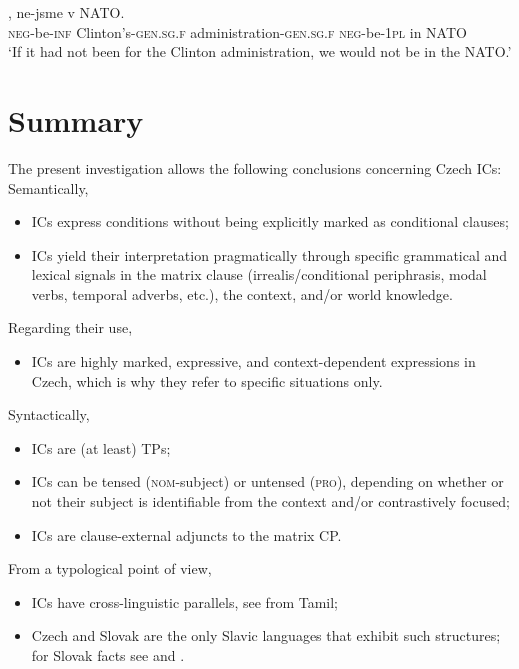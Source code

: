 \documentclass[output=paper,colorlinks,citecolor=brown,
modfonts,newtxmath
]{langscibook}
\begin{document}
\ea\label{ex:weltwissen}
, ne-jsme v NATO. \\
	{} \textsc{neg}-be-\textsc{inf} Clinton's-\textsc{gen.sg.f} administration-\textsc{gen.sg.f} \textsc{neg}-be-\textsc{1pl} in NATO \\
\glt `If it had not been for the Clinton administration, we would not be in the NATO.' \hfill \citep[Czech;][5]{Milotova2012}
\z


\section{Summary}\label{sec:summary}

The present investigation allows the following conclusions concerning Czech ICs:\\

Semantically,
\begin{itemize}
	\item ICs express conditions without being explicitly marked as conditional clauses;
	\item ICs yield their interpretation pragmatically through specific grammatical and lexical signals in the matrix clause (irrealis/conditional periphrasis, modal verbs, temporal adverbs, etc.), the context, and/or world knowledge.
\end{itemize}

Regarding their use,	
\begin{itemize}
	\item ICs are highly marked, expressive, and context-dependent expressions in Czech, which is why they refer to specific situations only.
\end{itemize}

Syntactically,
\begin{itemize}
	\item ICs are (at least) TPs;
	\item ICs can be tensed (\textsc{nom}-subject) or untensed (\textsc{pro}), depending on whether or not their subject is identifiable from the context and/or contrastively focused;
	\item ICs are clause-external adjuncts to the matrix CP.
\end{itemize}

From a typological point of view,
\begin{itemize}
	\item ICs have cross-linguistic parallels, see  from Tamil;
	\item Czech and Slovak are the only Slavic languages that exhibit such structures; for Slovak facts see \citet{Ruzicka1956} and \citet{Hirschova2005}.
\end{itemize}
\end{document}
